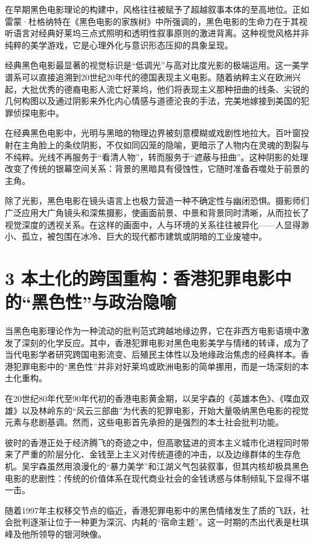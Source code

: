 \documentclass[11pt]{article}
\begin{document}
在早期黑色电影理论的构建中，风格往往被赋予了超越叙事本体的至高地位。正如雷蒙·杜格纳特在《黑色电影的家族树》中所强调的，黑色电影的生命力在于其视听语言对经典好莱坞三点式照明和透明性叙事原则的激进背离。这种视觉风格并非纯粹的美学游戏，它是心理外化与意识形态压抑的具象呈现。

经典黑色电影最显著的视觉标识是“低调光”与高对比度光影的极端运用。这一美学谱系可以直接追溯到20世纪20年代的德国表现主义电影。随着纳粹主义在欧洲兴起，大批优秀的德裔电影人流亡好莱坞，他们将表现主义那种扭曲的线条、尖锐的几何构图以及通过阴影来外化内心情感与道德沦丧的手法，完美地嫁接到美国的犯罪侦探电影中。

在经典黑色电影中，光明与黑暗的物理边界被刻意模糊或戏剧性地拉大。百叶窗投射在主角脸上的条纹阴影，不仅如同囚笼的隐喻，更暗示了人物内在灵魂的割裂与不纯粹。光线不再服务于“看清人物”，转而服务于“遮蔽与扭曲”。这种阴影的处理改变了传统的银幕空间关系：背景的黑暗具有侵蚀性，它随时准备吞噬处于前景的主角。

除了光影，黑色电影在镜头语言上也极力营造一种不确定性与幽闭恐惧。摄影师们广泛应用大广角镜头和深焦摄影，使画面前景、中景和背景同时清晰，从而拉长了视觉深度的透视关系。在这样的画面中，人与环境的关系往往被异化——人显得渺小、孤立，被包围在冰冷、巨大的现代都市建筑或阴暗的工业废墟中。

\section{3 本土化的跨国重构：香港犯罪电影中的“黑色性”与政治隐喻}

当黑色电影理论作为一种流动的批判范式跨越地缘边界，它在非西方电影语境中激发了深刻的化学反应。其中，香港犯罪电影对黑色电影美学与情绪的转译，成为了当代电影学者研究跨国电影流变、后殖民主体性以及地缘政治焦虑的经典样本。香港犯罪电影中的“黑色性”并非对好莱坞或欧洲电影的简单挪用，而是一场深刻的本土化重构。

在20世纪80年代至90年代初的香港电影黄金期，以吴宇森的《英雄本色》、《喋血双雄》以及林岭东的“风云三部曲”为代表的犯罪电影，开始大量吸纳黑色电影的视觉元素与悲剧基调。然而，这些电影首先承担的是强烈的本土社会批判功能。

彼时的香港正处于经济腾飞的奇迹之中，但高歌猛进的资本主义城市化进程同时带来了严重的阶层分化、金钱至上主义对传统道德的冲击，以及边缘群体的生存危机。吴宇森虽然用浪漫化的“暴力美学”和江湖义气包装叙事，但其内核却极具黑色电影的悲剧性：传统的价值体系在现代商业社会的金钱诱惑与体制倾轧下显得不堪一击。

随着1997年主权移交节点的临近，香港犯罪电影中的黑色情绪发生了质的飞跃，社会批判逐渐让位于一种更为深沉、内耗的“宿命主题”。这一时期的杰出代表是杜琪峰及他所领导的银河映像。
\end{document}
